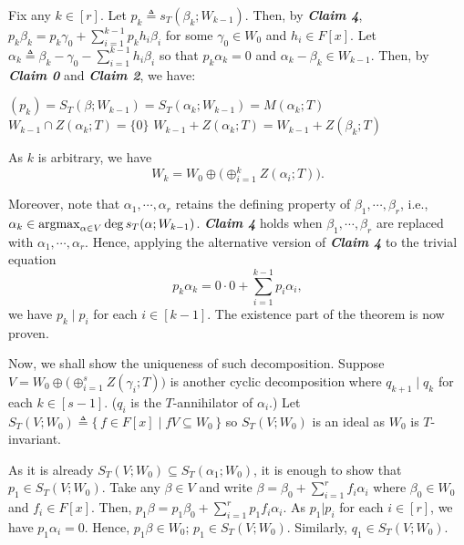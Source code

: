\documentclass[MAS212_Note.tex]{subfiles}
\begin{document}
{    Fix any \(k \in [r]\).
    Let \(p_k \triangleq s_T(\beta_k; W_{k-1})\).
    Then, by \textbf{\textit{Claim 4}},
    \(p_k \beta_k = p_k \gamma_0 + \sum_{i=1}^{k-1} p_k h_i \beta_i\)
    for some \(\gamma_0 \in W_0\) and \(h_i \in F[x]\).
    Let \(\alpha_k \triangleq \beta_k - \gamma_0 - \sum_{i=1}^{k-1} h_i \beta_i\)
    so that \(p_k \alpha_k = 0\) and \(\alpha_k - \beta_k \in W_{k-1}\).
    Then, by \textbf{\textit{Claim 0}} and  \textbf{\textit{Claim 2}},
    we have:
    \begin{itemize}[nolistsep]
        \ii \((p_k) = S_T(\beta; W_{k-1}) =  S_T(\alpha_k; W_{k-1}) = M(\alpha_k; T)\)
        \ii \(W_{k-1} \cap Z(\alpha_k; T) = \{0\}\)
        \ii \(W_{k-1} + Z(\alpha_k; T) = W_{k-1} + Z(\beta_k; T)\)
    \end{itemize}
    As \(k\) is arbitrary, we have
    \[
        W_k = W_0 \oplus \big(\oplus_{i=1}^k Z(\alpha_i; T)\big).
    \]

    Moreover, note that \(\alpha_1, \cdots, \alpha_r\) retains the defining property
    of \(\beta_1, \cdots, \beta_r\),
    i.e., \(\alpha_k \in \operatorname*{arg max}_{\alpha \in V} \deg s_T(\alpha; W_{k-1})\).
    \textbf{\textit{Claim 4}} holds when \(\beta_1, \cdots, \beta_r\)
    are replaced with \(\alpha_1, \cdots, \alpha_r\).
    Hence, applying the alternative version of \textbf{\textit{Claim 4}}
    to the trivial equation
    \[
        \textstyle p_k \alpha_k = 0 \cdot 0 + \sum_{i=1}^{k-1} p_i \alpha_i,
    \]
    we have \(p_k \mid p_i\) for each \(i \in [k - 1]\).
    The existence part of the theorem is now proven. \checkmark

    Now, we shall show the uniqueness of such decomposition.
    Suppose \(V = W_0 \oplus \big(\oplus_{i=1}^s Z(\gamma_i; T)\big)\)
    is another cyclic decomposition where \(q_{k+1} \mid q_k\) for each \(k \in [s - 1]\).
    (\(q_i\) is the \(T\)-annihilator of \(\alpha_i\).)
    Let \(S_T(V; W_0) \triangleq \{\,f \in F[x] \mid f V \subseteq W_0\,\}\)
    so \(S_T(V; W_0)\) is an ideal as \(W_0\) is \(T\)-invariant. 

    
    As it is already \(S_T(V; W_0) \subseteq S_T(\alpha_1; W_0)\),
    it is enough to show that \(p_1 \in S_T(V; W_0)\).
    Take any \(\beta \in V\) and write \(\beta = \beta_0 + \sum_{i=1}^{r} f_i \alpha_i\)
    where \(\beta_0 \in W_0\) and \(f_i \in F[x]\).
    Then, \(p_1 \beta = p_1 \beta_0 + \sum_{i=1}^{r} p_1 f_i \alpha_i\).
    As \(p_1 | p_i\) for each \(i \in [r]\), we have \(p_1 \alpha_i = 0\).
    Hence, \(p_1 \beta \in W_0\); \(p_1 \in S_T(V; W_0)\).
    Similarly, \(q_1 \in S_T(V; W_0)\). \checkmark

}
\end{document}
